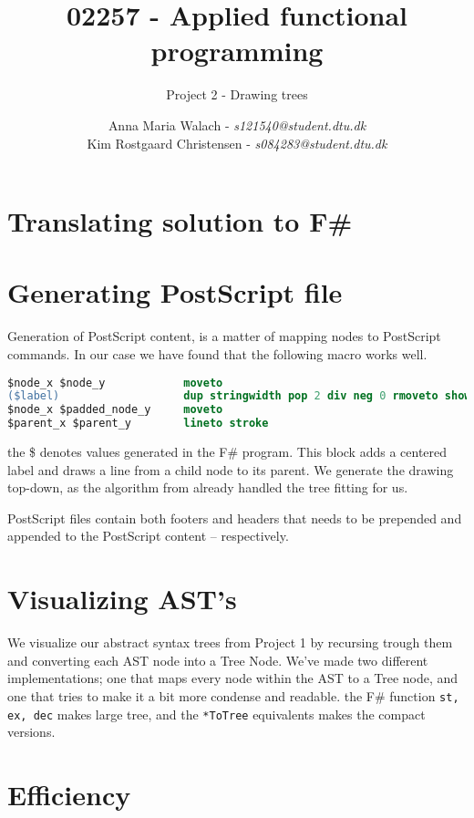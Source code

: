 \documentclass[10pt]{scrartcl}
\title{02257 - Applied functional programming}
\subtitle{Project 2 - Drawing trees}
\author{Anna Maria Walach - \textit {s121540@student.dtu.dk} \\ Kim Rostgaard Christensen - \textit {s084283@student.dtu.dk}}
\begin{document}
\maketitle
\section{Translating solution to F\#}
\section{Generating PostScript file}
Generation of PostScript content, is a matter of mapping nodes to PostScript commands. In our case we have found that the following macro works well.
\begin{lstlisting}[language=PostScript]
$node_x $node_y            moveto
($label)                   dup stringwidth pop 2 div neg 0 rmoveto show
$node_x $padded_node_y     moveto
$parent_x $parent_y        lineto stroke
\end{lstlisting}
the \$ denotes values generated in the F\# program. This block adds a centered label and draws a line from a child node to its parent.
We generate the drawing top-down, as the algorithm from \cite{kennedy1996functional} already handled the tree fitting for us.

PostScript files contain both footers and headers that needs to be prepended and appended to the PostScript content -- respectively.
\section{Visualizing AST's}
We visualize our abstract syntax trees from Project 1 by recursing trough them and converting each AST node into a Tree Node. We've made two different implementations; one that maps every node within the AST to a Tree node, and one that tries to make it a bit more condense and readable. the F\# function \texttt{st, ex, dec} makes large tree, and the \texttt{*ToTree} equivalents makes the compact versions.
\section{Efficiency}
\end{document}
